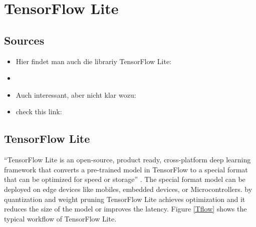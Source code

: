 %
%
%


\chapter{TensorFlow Lite}

\section{Sources}




\begin{itemize}
    \item Hier findet man auch die librariy TensorFlow Lite: 
    \item {}
    \item Auch interessant, aber nicht klar wozu:
    \item check this link: 
\end{itemize}



\section{TensorFlow Lite}

``TensorFlow Lite is an open-source, product ready, cross-platform deep learning framework that converts a pre-trained model in TensorFlow to a special format that can be optimized for speed or storage'' \cite{Khandelwal:2020}. The special format model can be deployed on edge devices like mobiles, embedded devices, or Microcontrollers. by quantization and weight pruning TensorFlow Lite achieves optimization and it reduces the size of the model or improves the latency. Figure \ref{Tflow} shows the typical  workflow of TensorFlow Lite. \cite{Khandelwal:2020}

